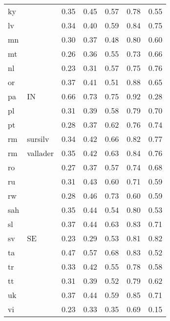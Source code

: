 \begin{table}[H]
\begin{tabular}{llrrrrr}
  ky &  & 0.35 & 0.45 & 0.57 & 0.78 & 0.55 \\ 
  lv &  & 0.34 & 0.40 & 0.59 & 0.84 & 0.75 \\ 
  mn &  & 0.30 & 0.37 & 0.48 & 0.80 & 0.60 \\ 
  mt &  & 0.26 & 0.36 & 0.55 & 0.73 & 0.66 \\ 
  nl &  & 0.23 & 0.31 & 0.57 & 0.75 & 0.76 \\ 
  or &  & 0.37 & 0.41 & 0.51 & 0.88 & 0.65 \\ 
  pa & IN & 0.66 & 0.73 & 0.75 & 0.92 & 0.28 \\ 
  pl &  & 0.31 & 0.39 & 0.58 & 0.79 & 0.70 \\ 
  pt &  & 0.28 & 0.37 & 0.62 & 0.76 & 0.74 \\ 
  rm & sursilv & 0.34 & 0.42 & 0.66 & 0.82 & 0.77 \\ 
  rm & vallader & 0.35 & 0.42 & 0.63 & 0.84 & 0.76 \\ 
  ro &  & 0.27 & 0.37 & 0.57 & 0.74 & 0.68 \\ 
  ru &  & 0.31 & 0.43 & 0.60 & 0.71 & 0.59 \\ 
  rw &  & 0.28 & 0.46 & 0.73 & 0.60 & 0.59 \\ 
  sah &  & 0.35 & 0.44 & 0.54 & 0.80 & 0.53 \\ 
  sl &  & 0.37 & 0.44 & 0.63 & 0.83 & 0.71 \\ 
  sv & SE & 0.23 & 0.29 & 0.53 & 0.81 & 0.82 \\ 
  ta &  & 0.47 & 0.57 & 0.68 & 0.83 & 0.52 \\ 
  tr &  & 0.33 & 0.42 & 0.55 & 0.78 & 0.58 \\ 
  tt &  & 0.31 & 0.39 & 0.52 & 0.79 & 0.62 \\ 
  uk &  & 0.37 & 0.44 & 0.59 & 0.85 & 0.71 \\ 
  vi &  & 0.23 & 0.33 & 0.35 & 0.69 & 0.15 \\ 
   \hline
\end{tabular}
\end{table}
